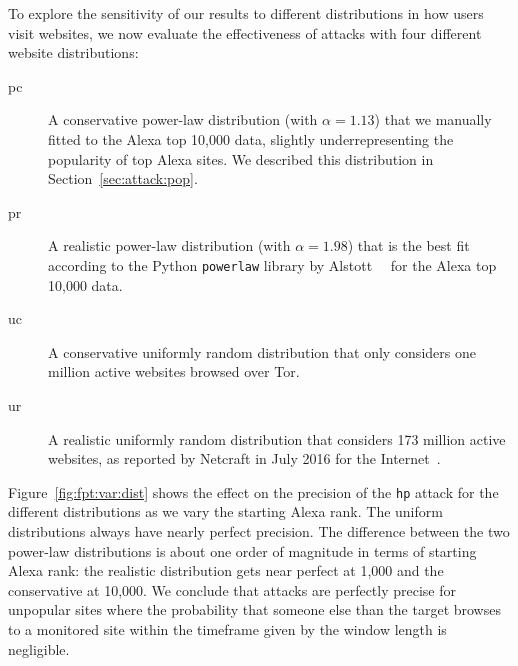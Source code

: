 To explore the sensitivity of our results to different distributions in
how users visit websites, we now evaluate the effectiveness of \name
attacks with four different website distributions:
\begin{description}
	\item[pc] A conservative power-law distribution
	(with $\alpha=1.13$)
	that we manually fitted to the Alexa top 10,000 data,
	slightly underrepresenting the popularity of top Alexa sites.
	We described this distribution in Section~\ref{sec:attack:pop}.
	\item[pr] A realistic power-law distribution
	(with $\alpha=1.98$)
	that is the best fit according to
	the Python {\tt powerlaw} library by Alstott~\ea~\cite{Alstott2014a} for the Alexa
	top 10,000 data.
	\item[uc] A conservative uniformly random distribution that
	only considers one million active websites browsed over Tor.
	\item[ur] A realistic uniformly random distribution that
          considers 173 million active websites, as reported by Netcraft
          in July 2016 for the Internet~\cite{numberofwebsites}.
\end{description}
Figure~\ref{fig:fpt:var:dist} shows the effect on the precision of the
\texttt{hp} attack for the different distributions as we vary the starting
Alexa rank. The uniform distributions always have nearly perfect precision.
The difference between the two power-law distributions is about one order of
magnitude in terms of starting Alexa rank: the realistic distribution gets
near perfect at 1,000 and the conservative at 10,000.
We conclude that \name attacks are perfectly precise for unpopular sites
where the probability that someone else than the target browses to a monitored
site within the timeframe given by the window length is negligible.
